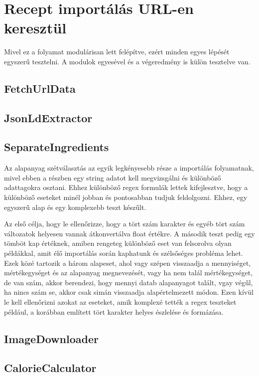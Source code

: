 \documentclass[12pt]{report}
\theoremstyle{definition}
\begin{document}
\section{Recept importálás URL-en keresztül}
Mivel ez a folyamat modulárisan lett felépítve, ezért minden egyes lépését egyszerű tesztelni. A modulok egyesével és a végeredmény is külön tesztelve van.

\subsection{FetchUrlData}

\subsection{JsonLdExtractor}

\subsection{SeparateIngredients}
Az alapanyag szétválasztás az egyik legkényesebb része a importálás folyamatnak, mivel ebben a részben egy string adatot kell megvizsgálni és különböző adattagokra osztani. Ehhez különböző regex formulák lettek kifejlesztve, hogy a különböző eseteket minél jobban és pontosabban tudjuk feldolgozni. Ehhez, egy egyszerű alap és egy komplexebb teszt készűlt.

Az első célja, hogy le ellenőrizze, hogy a tört szám karakter és egyéb tört szám változatok helyesen vannak átkonvertálva float értékre. A második teszt pedig egy tömböt kap értéknek, amiben rengeteg különböző eset van felsorolva olyan példákkal, amit élő importálás során kaphatunk és szélsőséges probléma lehet. Ezek közé tartozik a három alapeset, ahol vagy szépen visszaadja a mennyiséget, mértékegységet és az alapanyag megnevezését, vagy ha nem talál mértékegységet, de van szám, akkor berendezi, hogy mennyi datab alapanyagot talált, vgay végűl, ha nincs szám se, akkor csak simán visszaadja alapértelmezett módon. Ezen kívül le kell ellenőrizni azokat az eseteket, amik komplexé tették a regex teszteket például, a korábban említett tört karakter helyes észlelése és formázása.

\subsection{ImageDownloader}

\subsection{CalorieCalculator}
\end{document}
